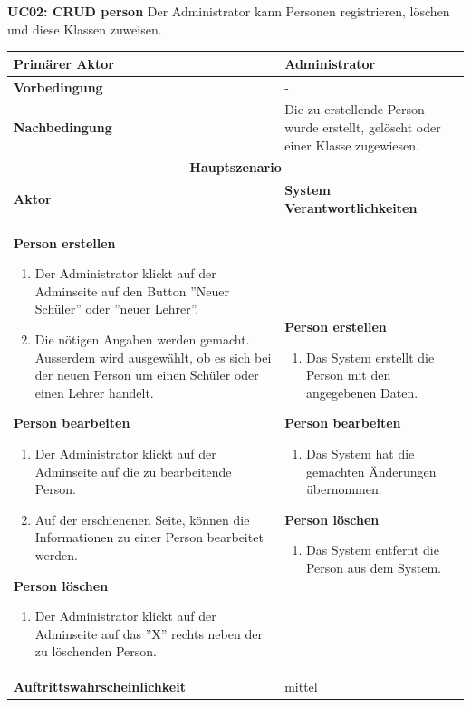 \textbf{UC02: CRUD person} Der Administrator kann Personen registrieren, löschen und diese Klassen zuweisen.

\begin{tabularx}{\textwidth}{| X | X |}
	\hline
		\textbf{Primärer Aktor} & Administrator \\
	\hline
		\textbf{Vorbedingung} & - \\
	\hline
		\textbf{Nachbedingung} & Die zu erstellende Person wurde erstellt, gelöscht oder einer Klasse zugewiesen. \\
	\hline
		\multicolumn{2}{|c|}{\textbf{Hauptszenario}} \\
	\hline
		\textbf{Aktor} & \textbf{System Verantwortlichkeiten} \\
	\hline
		\textbf{Person erstellen}
		\begin{enumerate}
			\item Der Administrator klickt auf der Adminseite auf den Button ''Neuer Schüler'' oder ''neuer Lehrer''.
			\item Die nötigen Angaben werden gemacht. Ausserdem wird ausgewählt, ob es sich bei der neuen Person um einen Schüler oder einen Lehrer handelt.
		\end{enumerate}
		
		\textbf{Person bearbeiten}
		\begin{enumerate}
			\item Der Administrator klickt auf der Adminseite auf die zu bearbeitende Person.
			\item Auf der erschienenen Seite, können die Informationen zu einer Person bearbeitet werden.
		\end{enumerate} 
		
		\textbf{Person löschen}
		\begin{enumerate}
			\item Der Administrator klickt auf der Adminseite auf das ''X'' rechts neben der zu löschenden Person.
		\end{enumerate} 
			& 
		\textbf{Person erstellen}
		\begin{enumerate}
			\item Das System erstellt die Person mit den angegebenen Daten.
		\end{enumerate} 
		
		\textbf{Person bearbeiten}
		\begin{enumerate}
			\item Das System hat die gemachten Änderungen übernommen.
		\end{enumerate}		
		
		\textbf{Person löschen}
		\begin{enumerate}
			\item Das System entfernt die Person aus dem System.
		\end{enumerate}	
		\\
	\hline
		\textbf{Auftrittswahrscheinlichkeit} & mittel \\
	\hline
\end{tabularx}


